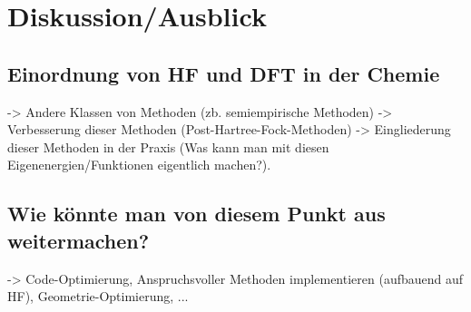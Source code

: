 \documentclass[a4paper, 12pt]{report}
\begin{document}
\chapter{Diskussion/Ausblick}
\section{Einordnung von HF und DFT in der Chemie}
-> Andere Klassen von Methoden (zb. semiempirische Methoden)
-> Verbesserung dieser Methoden (Post-Hartree-Fock-Methoden)
-> Eingliederung dieser Methoden in der Praxis (Was kann man mit
diesen Eigenenergien/Funktionen eigentlich machen?).

\section{Wie könnte man von diesem Punkt aus weitermachen?}
-> Code-Optimierung, Anspruchsvoller Methoden implementieren
(aufbauend auf HF), Geometrie-Optimierung, ...



\end{document}
